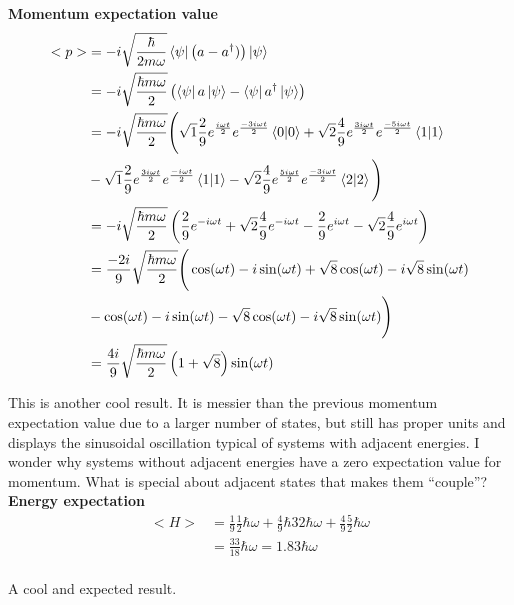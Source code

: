\documentclass[10pt]{article} %
\begin{document}
\textbf{Momentum expectation value}
\begin{align*}
  <p> &= -i\sqrt{\frac{\hbar}{2m\omega}}\bra{\psi}\left(a - a^\dagger)\right)\ket{\psi}\\
  &= -i\sqrt{\frac{\hbar m\omega}{2}}\left(\bra{\psi}a\ket{\psi}
  - \bra{\psi}a^\dagger\ket{\psi}\right)\\
  &= -i\sqrt{\frac{\hbar m\omega}{2}}
  \Bigg(
  \sqrt{1}\frac{2}{9}e^{\frac{i\omega t}{2}}e^{\frac{-3i\omega t}{2}}\bra{0}\ket{0}
  + \sqrt{2}\frac{4}{9}e^{\frac{3i\omega t}{2}}e^{\frac{-5i\omega t}{2}}\bra{1}\ket{1}\\
  &-\sqrt{1}\frac{2}{9}e^{\frac{3i\omega t}{2}}e^{\frac{-i\omega t}{2}}\bra{1}\ket{1}
  - \sqrt{2}\frac{4}{9}e^{\frac{5i\omega t}{2}}e^{\frac{-3i\omega t}{2}}\bra{2}\ket{2}
  \Bigg)\\
  &= -i\sqrt{\frac{\hbar m\omega}{2}}
  \left(\frac{2}{9}e^{-i\omega t} + \sqrt{2}\frac{4}{9}e^{-i\omega t}
  - \frac{2}{9}e^{i\omega t} - \sqrt{2}\frac{4}{9}e^{i\omega t}\right)\\
  &= \frac{-2i}{9}\sqrt{\frac{\hbar m\omega}{2}}
  \Bigg(
  \cos(\omega t) - i\sin(\omega t)
  + \sqrt{8}\cos(\omega t) - i\sqrt{8}\sin(\omega t)\\
  &- \cos(\omega t) - i\sin(\omega t)
  - \sqrt{8}\cos(\omega t) - i\sqrt{8}\sin(\omega t)
  \Bigg)\\
  &= \frac{4i}{9}\sqrt{\frac{\hbar m\omega}{2}}\left(1 + \sqrt{8}\right)\sin(\omega t)\\
\end{align*}

This is another cool result. It is messier than the previous momentum expectation value due to
a larger number of states, but still has proper units and displays the sinusoidal oscillation
typical of systems with adjacent energies. I wonder why systems without adjacent energies have a
zero expectation value for momentum. What is special about adjacent states that makes them
``couple''?\\

\textbf{Energy expectation}
\begin{align*}
  <H> &= \frac{1}{9}\frac{1}{2}\hbar\omega + \frac{4}{9}\hbar{3}{2}\hbar\omega
  + \frac{4}{9}\frac{5}{2}\hbar\omega\\
  &= \frac{33}{18}\hbar\omega = 1.83\hbar\omega\\
\end{align*}

A cool and expected result.\\
\end{document}
